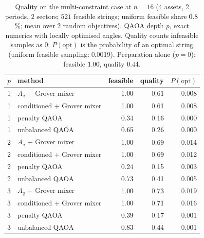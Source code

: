\begin{table}[t]
\centering\small\setlength{\tabcolsep}{4pt}
\caption{ Quality on the multi-constraint case at $n=16$ (4 assets, 2 periods, 2 sectors; $521$ feasible strings; uniform feasible share $0.8$\,\%; mean over 2 random objectives). QAOA depth $p$, exact numerics with locally optimised angles. Quality counts infeasible samples as $0$; $P(\mathrm{opt})$ is the probability of an optimal string (uniform feasible sampling: 0.0019). Preparation alone ($p=0$): feasible $1.00$, quality 0.44.}\label{tab:large_quality}
\begin{tabular}{llrrr}
\toprule
$p$ & method & feasible & quality & $P(\mathrm{opt})$\\
\midrule
1 & $A_q$ + Grover mixer & 1.00 & 0.61 & 0.008\\
1 & conditioned + Grover mixer & 1.00 & 0.61 & 0.008\\
1 & penalty QAOA & 0.34 & 0.16 & 0.000\\
1 & unbalanced QAOA & 0.65 & 0.26 & 0.000\\
\midrule
2 & $A_q$ + Grover mixer & 1.00 & 0.69 & 0.014\\
2 & conditioned + Grover mixer & 1.00 & 0.69 & 0.012\\
2 & penalty QAOA & 0.24 & 0.15 & 0.003\\
2 & unbalanced QAOA & 0.73 & 0.41 & 0.005\\
\midrule
3 & $A_q$ + Grover mixer & 1.00 & 0.73 & 0.019\\
3 & conditioned + Grover mixer & 1.00 & 0.71 & 0.016\\
3 & penalty QAOA & 0.39 & 0.17 & 0.001\\
3 & unbalanced QAOA & 0.83 & 0.44 & 0.001\\
\bottomrule
\end{tabular}
\end{table}

